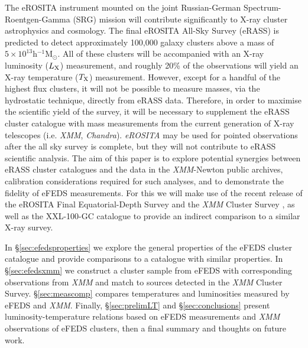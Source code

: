 \documentclass[fleqn,usenatbib]{mnras}
\begin{document}
The eROSITA instrument mounted on the joint Russian-German Spectrum-Roentgen-Gamma (SRG) mission will contribute significantly to X-ray cluster astrophysics and cosmology. The final eROSITA All-Sky Survey (eRASS) is predicted to detect approximately 100,000 galaxy clusters above a mass of $5\times10^{13}$h$^{-1}$M$_{\odot}$. All of these clusters will be accompanied with an X-ray luminosity ($L_{\rm X}$) measurement, and roughly 20\% \citep[][]{efedsclustercat} of the observations will yield an X-ray temperature ($T_{\rm X}$) measurement. However, except for a handful of the highest flux clusters, it will not be  possible to measure masses, via the hydrostatic technique, directly from eRASS data. Therefore, in order to maximise the scientific yield of the survey, it will be necessary to supplement the eRASS cluster catalogue with mass measurements from the current generation of X-ray telescopes (i.e. {\em XMM}, {\em Chandra}). {\em eROSITA} may be used for pointed observations after the all sky survey is complete, but they will not contribute to eRASS scientific analysis.
The aim of this paper is to explore potential synergies between eRASS cluster catalogues and the data in the {\em XMM}-Newton public archives, calibration considerations required for such analyses, and to demonstrate the fidelity of eFEDS measurements. For this we will make use of the recent release of the eROSITA Final Equatorial-Depth Survey \citep[eFEDS,][]{efedscat} and the {\em XMM} Cluster Survey \citep[][]{xcsfoundation}, as well as the XXL-100-GC catalogue \citep[][]{xxlgc100} to provide an indirect comparison to a similar X-ray survey.


In \S\ref{sec:efedsproperties} we explore the general properties of the eFEDS cluster catalogue and provide comparisons to a catalogue with similar properties. In \S\ref{sec:efedsxmm} we construct a cluster sample from eFEDS with corresponding observations from {\em XMM} and match to sources detected in the {\em XMM} Cluster Survey. \S\ref{sec:meascomp} compares temperatures and luminosities measured by eFEDS and {\em XMM}. Finally, \S\ref{sec:prelimLT} and \S\ref{sec:conclusions} present luminosity-temperature relations based on eFEDS measurements and {\em XMM} observations of eFEDS clusters, then a final summary and thoughts on future work.
\end{document}
